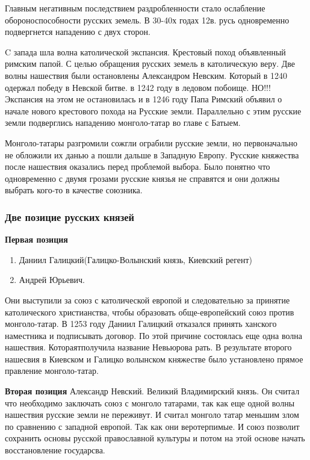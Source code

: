 \documentclass[a4paper]{article}
\begin{document}
Главным негативным последствием раздробленности стало ослабление обороноспособности русских земель.
В 30-40х годах 12в. русь одновременно подвергнется нападению с двух сторон.

C запада шла волна католической экспансия. Крестовый поход объявленный римским папой. С целью обращения русских земель в католическую веру. Две волны нашествия были остановлены Александром Невским. Который в 1240 одержал победу в Невской битве. в 1242 году в ледовом побоище. НО!!! Экспансия на этом не остановилась и в 1246 году Папа Римский объявил о начале нового крестового похода на Русские земли. Параллельно с этим русские земли подверглись нападению монголо-татар во главе с Батыем.

Монголо-татары разгромили сожгли ограбили русские земли, но первоначально не обложили их данью а пошли дальше в Западную Европу. Русские княжества после нашествия оказались перед проблемой выбора. Было понятно что одновременно с двумя грозами русские князья не справятся и они должны выбрать кого-то в качестве союзника.

\subsubsection{Две позицие русских князей}
\textbf{Первая позиция}

\begin{enumerate}
    \item Даниил Галицкий(Галицко-Волынский князь, Киевский регент)
    \item Андрей Юрьевич.       
\end{enumerate}

Они выступили за союз с католической европой и следовательно за принятие католического христианства, чтобы образовать обще-европейский союз против монголо-татар. В 1253 году Даниил Галицкий отказался принять ханского наместника и подписывать договор. По этой причине состоялась еще одна волна нашествия. Котораятполучила название Невьюрова рать.
В результате второго нашесвия в Киевском и Галицко волынском княжестве было установлено прямое правление монголо-татар.


\textbf{Вторая позиция}
Александр Невский. Великий Владимирский князь. Он считал что необходимо заключать союз с монголо татарами, так как еще одной волны нашествия русские земли не переживут. И считал монголо татар меньшим злом по сравнению с западной европой. Так как они веротерпимые. И союз позволит сохранить основы русской православной культуры и потом на этой основе начать восстановление государсва. 
\end{document}
